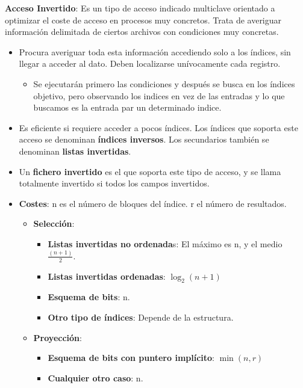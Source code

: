 \documentclass[12pt, twoside, openright]{report} %
\begin{document}
  \pagebreak
  \textbf{Acceso Invertido}: Es un tipo de acceso indicado multiclave
  orientado a optimizar el coste de acceso en procesos muy concretos.
  Trata de averiguar información delimitada de ciertos archivos con
  condiciones muy concretas.
  

  \begin{itemize}
  \item Procura averiguar toda esta información accediendo solo a los
    índices, sin llegar a acceder al dato. Deben localizarse
    unívocamente cada registro.
    

    \begin{itemize}
    \item Se ejecutarán primero las condiciones y después se busca en los
      índices objetivo, pero observando los indices en vez de las
      entradas y lo que buscamos es la entrada par un determinado
      indice.
      
    \end{itemize}
  \item Es eficiente si requiere acceder a pocos índices. Los índices que
    soporta este acceso se denominan \textbf{índices inversos}. Los
    secundarios también se denominan \textbf{listas invertidas}.
    
  \item Un \textbf{fichero invertido} es el que soporta este tipo de acceso,
    y se llama totalmente invertido si todos los campos invertidos.
    
  \item \textbf{Costes}: n es el número de bloques del índice. r el número
    de resultados.
    

    \begin{itemize}
    \item \textbf{Selección}:
      

      \begin{itemize}
      \item \textbf{Listas invertidas no ordenada}s: El máximo es n, y el
        medio $\frac{(n+1)}{2}$.
        
      \item \textbf{Listas invertidas ordenadas}: $\log_2(n+1)$
        
      \item \textbf{Esquema de bits}: n.
        
      \item \textbf{Otro tipo de índices}: Depende de la estructura.
        
      \end{itemize}
    \item \textbf{Proyección}:
      

      \begin{itemize}
      \item \textbf{Esquema de bits con puntero implícito}: $\min(n, r)$
        
      \item \textbf{Cualquier otro caso}: n.
        
      \end{itemize}
    \end{itemize}
  \end{itemize}



\end{document}
